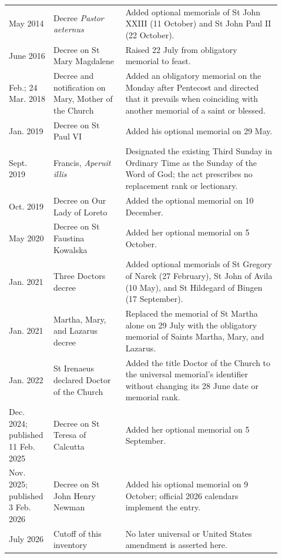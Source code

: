 \begin{longtable}{>{\raggedright\arraybackslash}p{0.13\linewidth}>{\raggedright\arraybackslash}p{0.25\linewidth}>{\raggedright\arraybackslash}p{0.54\linewidth}}
29 May 2014 & Decree \emph{Pastor aeternus} & Added optional memorials of St John XXIII (11 October) and St John Paul II (22 October).\\
3 June 2016 & Decree on St Mary Magdalene & Raised 22 July from obligatory memorial to feast.\\
11 Feb.; 24 Mar. 2018 & Decree and notification on Mary, Mother of the Church & Added an obligatory memorial on the Monday after Pentecost and directed that it prevails when coinciding with another memorial of a saint or blessed.\\
25 Jan. 2019 & Decree on St Paul VI & Added his optional memorial on 29 May.\\
30 Sept. 2019 & Francis, \emph{Aperuit illis} & Designated the existing Third Sunday in Ordinary Time as the Sunday of the Word of God; the act prescribes no replacement rank or lectionary.\\
7 Oct. 2019 & Decree on Our Lady of Loreto & Added the optional memorial on 10 December.\\
18 May 2020 & Decree on St Faustina Kowalska & Added her optional memorial on 5 October.\\
25 Jan. 2021 & Three Doctors decree & Added optional memorials of St Gregory of Narek (27 February), St John of Avila (10 May), and St Hildegard of Bingen (17 September).\\
26 Jan. 2021 & Martha, Mary, and Lazarus decree & Replaced the memorial of St Martha alone on 29 July with the obligatory memorial of Saints Martha, Mary, and Lazarus.\\
21 Jan. 2022 & St Irenaeus declared Doctor of the Church & Added the title Doctor of the Church to the universal memorial's identifier without changing its 28 June date or memorial rank.\\
24 Dec. 2024; published 11 Feb. 2025 & Decree on St Teresa of Calcutta & Added her optional memorial on 5 September.\\
9 Nov. 2025; published 3 Feb. 2026 & Decree on St John Henry Newman & Added his optional memorial on 9 October; official 2026 calendars implement the entry.\\
17 July 2026 & Cutoff of this inventory & No later universal or United States amendment is asserted here.\\
\bottomrule
\end{longtable}
